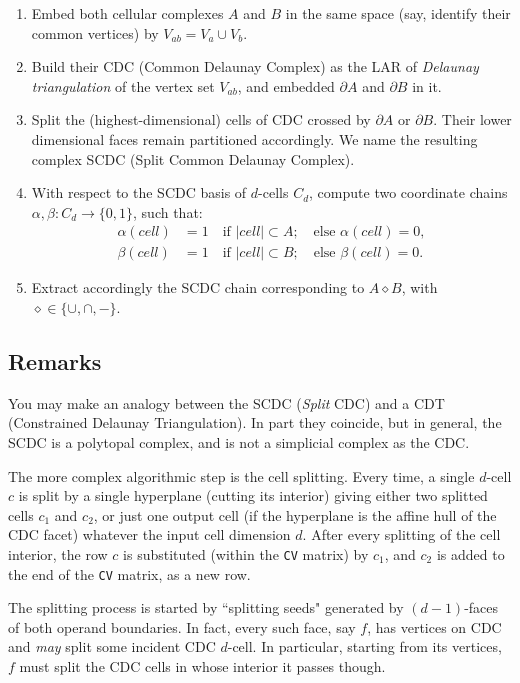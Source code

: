 \documentclass[11pt,oneside]{article}	%
\begin{document}
\begin{enumerate}
\item 
Embed both cellular complexes $A$ and $B$ in the same space (say, identify their common vertices) by $V_{ab} = V_a \cup V_b$.
\item 
Build their CDC  (Common Delaunay Complex) as the LAR of \emph{Delaunay triangulation} of the vertex set $V_{ab}$, and embedded $\partial A$ and $\partial B$ in it.
\item 
Split the (highest-dimensional) cells of CDC crossed by $\partial A$ or $\partial B$. Their lower dimensional faces remain partitioned accordingly. We name the resulting complex SCDC (Split Common Delaunay Complex).
\item 
With respect to the SCDC basis of $d$-cells $C_d$, compute two coordinate chains $\alpha,\beta: C_d \to \{0,1\}$, such that: 
\begin{align}
	\alpha(cell) &= 1  \quad\mbox{if\ } |cell| \subset A;  \quad\mbox{else\ } \alpha(cell) = 0, \nonumber\\
	\beta(cell) &= 1  \quad\mbox{if\ } |cell| \subset B;  \quad\mbox{else\ } \beta(cell) = 0. \nonumber
\end{align}
\item 
Extract accordingly the SCDC chain corresponding to $A \diamond B$, with $\diamond\in \{\cup, \cap, -\}$.
\end{enumerate}


\subsection{Remarks}

You may  make an analogy between the SCDC (\emph{Split} CDC) and a CDT (Constrained Delaunay Triangulation).  In part they coincide, but in general, the SCDC is a polytopal complex, and is not a simplicial complex as the CDC.

The more complex algorithmic step is the cell splitting.  
Every time, a single $d$-cell  $c$  is split by a single hyperplane (cutting its interior)  giving either two splitted cells $c_1$ and $c_2$, or just one output cell (if the hyperplane is the affine hull of the CDC facet)
whatever the input cell dimension $d$.  After every splitting of the cell interior, the row $c$ is substituted (within the \texttt{CV} matrix) by $c_1$, and $c_2$ is 
added to the end of the \texttt{CV} matrix, as a new row.

The splitting process is started by ``splitting seeds" generated by $(d-1)$-faces of both operand boundaries.
In fact, every such face, say $f$, has vertices on CDC and \emph{may} split some incident CDC $d$-cell.  In particular, starting from its vertices,
$f$ must split the CDC cells in whose interior it passes though.
\end{document}
